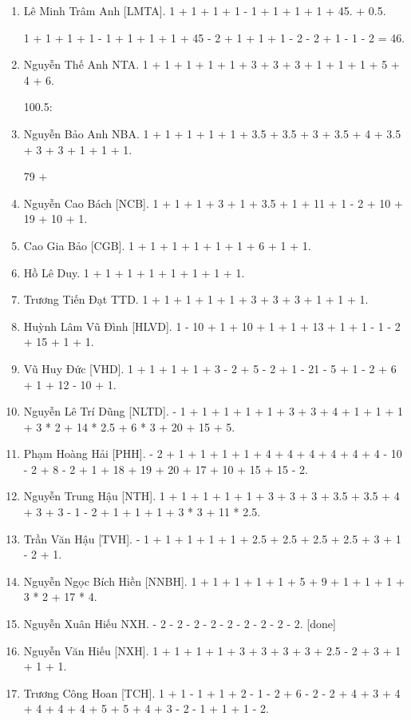 \documentclass{article}
\begin{document}
\begin{enumerate}
	\item {\sc Lê Minh Trâm Anh [LMTA].} 1 + 1 + 1 + 1 - 1 + 1 + 1 + 1 + 45. + 0.5.
	
	1 + 1 + 1 + 1 - 1 + 1 + 1 + 1 + 45 - 2 + 1 + 1 + 1 - 2 - 2 + 1 - 1 - 2 = 46.
	\item {\sc Nguyễn Thế Anh {NTA}.} 1 + 1 + 1 + 1 + 1 + 3 + 3 + 3 + 1 + 1 + 1 + 5 + 4 + 6.
	
	100.5:
	\item {\sc Nguyễn Bảo Anh {NBA}.} 1 + 1 + 1 + 1 + 1 + 3.5 + 3.5 + 3 + 3.5 + 4 + 3.5 + 3 + 3 + 1 + 1 + 1.
	
	79 + 
	\item {\sc Nguyễn Cao Bách [NCB].} 1 + 1 + 1 + 3 + 1 + 3.5 + 1 + 11 + 1 - 2 + 10 + 19 + 10 + 1.
	\item {\sc Cao Gia Bảo [CGB].} 1 + 1 + 1 + 1 + 1 + 1 + 6 + 1 + 1.
	\item {\sc Hồ Lê Duy.} 1 + 1 + 1 + 1 + 1 + 1 + 1 + 1.
	\item {\sc Trương Tiến Đạt {TTD}.} 1 + 1 + 1 + 1 + 1 + 3 + 3 + 3 + 1 + 1 + 1.
	\item {\sc Huỳnh Lâm Vũ Đình [HLVD].} 1 - 10 + 1 + 10 + 1 + 1 + 13 + 1 + 1 - 1 - 2 + 15 + 1 + 1.
	\item {\sc Vũ Huy Đức [VHD].} 1 + 1 + 1 + 1 + 3 - 2 + 5 - 2 + 1 - 21 - 5 + 1 - 2 + 6 + 1 + 12 - 10 + 1.
	\item {\sc Nguyễn Lê Trí Dũng [NLTD].} - 1 + 1 + 1 + 1 + 1 + 3 + 3 + 4 + 1 + 1 + 1 + 3 * 2 + 14 * 2.5 + 6 * 3 + 20 + 15 + 5.
	\item {\sc Phạm Hoàng Hải [PHH].} - 2 + 1 + 1 + 1 + 1 + 4 + 4 + 4 + 4 + 4 + 4 - 10 - 2 + 8 - 2 + 1 + 18 + 19 + 20 + 17 + 10 + 15 + 15 - 2.
	\item {\sc Nguyễn Trung Hậu [NTH].} 1 + 1 + 1 + 1 + 1 + 3 + 3 + 3 + 3.5 + 3.5 + 4 + 3 + 3 - 1 - 2 + 1 + 1 + 1 + 3 * 3 + 11 * 2.5.
	\item {\sc Trần Văn Hậu [TVH].} - 1 + 1 + 1 + 1 + 1 + 2.5 + 2.5 + 2.5 + 2.5 + 3 + 1 - 2 + 1.
	\item {\sc Nguyễn Ngọc Bích Hiền [NNBH].} 1 + 1 + 1 + 1 + 1 + 5 + 9 + 1 + 1 + 1 + 3 * 2 + 17 * 4.
	\item {\sc Nguyễn Xuân Hiếu {NXH}.} - 2 - 2 - 2 - 2 - 2 - 2 - 2 - 2 - 2. [done]
	\item {\sc Nguyễn Văn Hiếu [NXH].} 1 + 1 + 1 + 1 + 3 + 3 + 3 + 3 + 2.5 - 2 + 3 + 1 + 1 + 1.
	\item {\sc Trương Công Hoan [TCH].} 1 + 1 - 1 + 1 + 2 - 1 - 2 + 6 - 2 - 2 + 4 + 3 + 4 + 4 + 4 + 4 + 5 + 5 + 4 + 3 - 2 - 1 + 1 + 1 - 2.

\end{enumerate}
\end{document}
